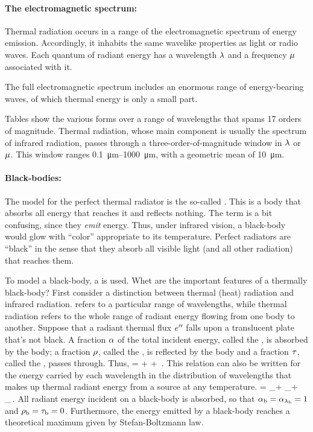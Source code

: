 \paragraph{The electromagnetic spectrum:}
Thermal radiation occurs in a range of the electromagnetic spectrum of energy emission. Accordingly, it inhabits the same wavelike properties as light or radio waves. Each quantum of radiant energy has a wavelength $\lambda$ and a frequency $\mu$ associated with it.

The full electromagnetic spectrum includes an enormous range of energy-bearing waves, of which thermal energy is only a small part.

Tables show the various forms over a range of wavelengths that spams 17 orders of magnitude. Thermal radiation, whose main component is usually the spectrum of infrared radiation, passes through a three-order-of-magnitude window in $\lambda$ or $\mu$. This window ranges \SIrange{0.1}{1000}{\micro m}, with a geometric mean of \SI{10}{\micro m}.

\paragraph{Black-bodies:}
The model for the perfect thermal radiator is the so-called . This is a body that absorbs all energy that reaches it and reflects nothing. The term is a bit confusing, since they \emph{emit} energy. Thus, under infrared vision, a black-body would glow with ``color'' appropriate to its temperature. Perfect radiators are ``black'' in the sense that they absorb all visible light (and all other radiation) that reaches them.

To model a black-body, a  is used. Whet are the important features of a thermally black-body? First consider a distinction between thermal (heat) radiation and infrared radiation.  refers to a particular range of wavelengths, while thermal radiation refers to the whole range of radiant energy flowing from one body to another. Suppose that a radiant thermal flux ${e}^{\prime\prime}$ falls upon a translucent plate that's not black. A fraction $\alpha$ of the total incident energy, called the , is absorbed by the body; a fraction $\rho$, called the , is reflected by the body and a fraction $\tau$, called the , passes through. Thus,
 = \absorb +  + \transm \,.
\eeq
This relation can also be written for the energy carried by each wavelength in the distribution of wavelengths that makes up thermal radiant energy from a source at any temperature. 
 = \absorb_\wlen + _\wlen + \transm_\wlen \,.
\eeq
All radiant energy incident on a black-body is absorbed, so that $\alpha_\text{b} = \alpha_{\lambda_\text{b}} = 1$ and $\rho_\text{b} = \tau_\text{b} = 0$. Furthermore, the energy emitted by a black-body reaches a theoretical maximum given by Stefan-Boltzmann law.


